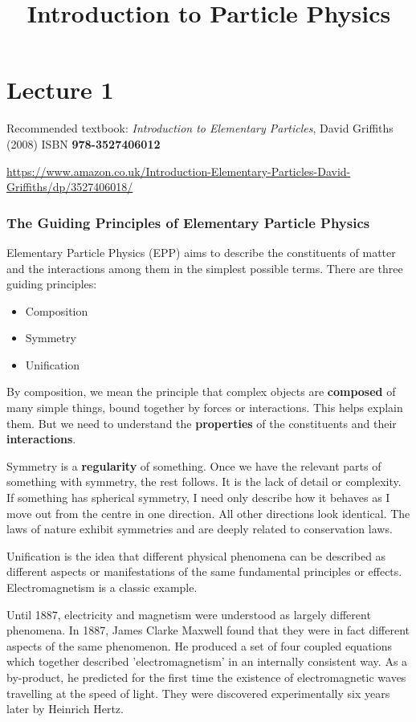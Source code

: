 \documentclass[10pt,a4paper]{article}
\title{Introduction to Particle Physics}
\begin{document}
\part*{Lecture 1}

Recommended textbook: \textit{Introduction to Elementary Particles}, David Griffiths (2008) ISBN \textbf{978-3527406012}

\vspace{10pt}

\noindent \url{https://www.amazon.co.uk/Introduction-Elementary-Particles-David-Griffiths/dp/3527406018/}

\section*{The Guiding Principles of Elementary Particle Physics}

Elementary Particle Physics (EPP) aims to describe the constituents of matter and the interactions among them in the simplest possible terms. There are three guiding principles:

\begin{itemize}
\item Composition
\item Symmetry
\item Unification
\end{itemize}

By composition, we mean the principle that complex objects are \textbf{composed} of many simple things, bound together by forces or interactions. This helps explain them. But we need to understand the \textbf{properties} of the constituents and their \textbf{interactions}.

Symmetry is a \textbf{regularity} of something. Once we have the relevant parts of something with symmetry, the rest follows. It is the lack of detail or complexity. If something has spherical symmetry, I need only describe how it behaves as I move out from the centre in one direction. All other directions look identical. The laws of nature exhibit symmetries and are deeply related to conservation laws.

Unification is the idea that different physical phenomena can be described as different aspects or manifestations of the same fundamental principles or effects. Electromagnetism is a classic example.

Until 1887, electricity and magnetism were understood as largely different phenomena. In 1887, James Clarke Maxwell found that they were in fact different aspects of the same phenomenon. He produced a set of four coupled equations which together described 'electromagnetism' in an internally consistent way. As a by-product, he predicted for the first time the existence of electromagnetic waves travelling at the speed of light. They were discovered experimentally six years later by Heinrich Hertz.
\end{document}
